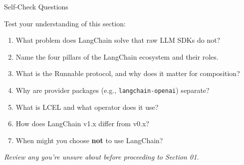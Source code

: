 \documentclass[aspectratio=169,11pt]{beamer}
\begin{document}
\begin{frame}{Self-Check Questions}

Test your understanding of this section:

\begin{enumerate}\setlength{\itemsep}{2pt}
  \item What problem does LangChain solve that raw LLM SDKs do not?
  \item Name the four pillars of the LangChain ecosystem and their roles.
  \item What is the Runnable protocol, and why does it matter for composition?
  \item Why are provider packages (e.g., \texttt{langchain-openai}) separate?
  \item What is LCEL and what operator does it use?
  \item How does LangChain v1.x differ from v0.x?
  \item When might you choose \textbf{not} to use LangChain?
\end{enumerate}

\vspace{0.2cm}
\textit{Review any you're unsure about before proceeding to Section 01.}
\end{frame}
\end{document}
